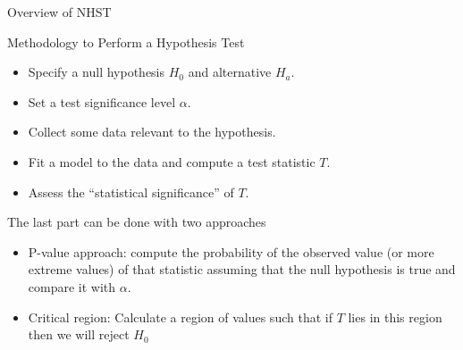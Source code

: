 \documentclass[handout]{beamer}
\begin{document}
\begin{frame}{Overview of NHST}
\scriptsize{


\begin{block}{Methodology to Perform a Hypothesis Test}
\begin{itemize}
 \item Specify a null hypothesis $H_0$ and alternative $H_a$.
 \item Set a test significance level $\alpha$.
 \item Collect some data relevant to the hypothesis.
 \item Fit a model to the data and compute a test statistic $T$.
 \item Assess the ``statistical significance'' of $T$.
\end{itemize}
\end{block}

The last part can be done with two approaches
\begin{itemize}
 \item P-value approach: compute the probability of the observed value (or more extreme values) of that statistic assuming that the null hypothesis is true and compare it with $\alpha$.

\item Critical region: Calculate a region of values such that if $T$ lies in this region then we will reject $H_0$ 

\end{itemize}



} 
\end{frame}
\end{document}
